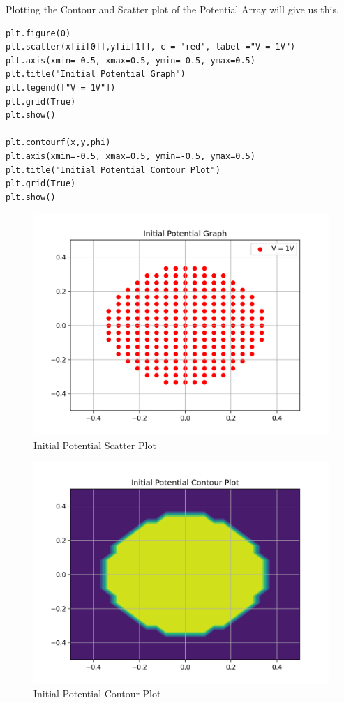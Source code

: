 \documentclass[12pt, a4paper]{report}
\begin{document}
Plotting the Contour and Scatter plot of the Potential Array will give us this,
\begin{Verbatim}
plt.figure(0)
plt.scatter(x[ii[0]],y[ii[1]], c = 'red', label ="V = 1V")
plt.axis(xmin=-0.5, xmax=0.5, ymin=-0.5, ymax=0.5)
plt.title("Initial Potential Graph")
plt.legend(["V = 1V"])
plt.grid(True)
plt.show()

plt.contourf(x,y,phi)
plt.axis(xmin=-0.5, xmax=0.5, ymin=-0.5, ymax=0.5)
plt.title("Initial Potential Contour Plot")
plt.grid(True)
plt.show()
\end{Verbatim}

\begin{figure}[!tbh]
   	\centering
   	\includegraphics[scale=0.8]{Q1.png}
   	\caption{Initial Potential Scatter Plot}
 \end{figure} 


\begin{figure}[!tbh]
   	\centering
   	\includegraphics[scale=0.8]{Q1b.png}
   	\caption{Initial Potential Contour Plot}
   	\label{fig:allgraphs}
 \end{figure} 
 
\end{document}
